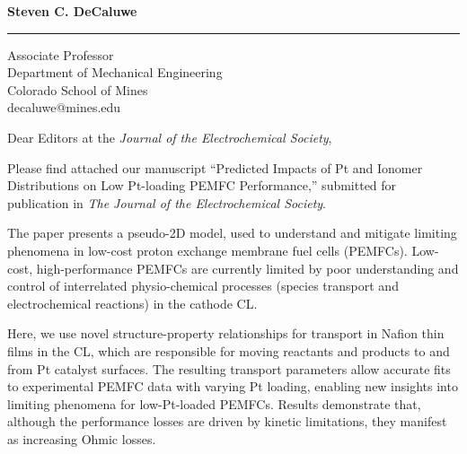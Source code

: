 \documentclass{letter} %
\begin{document}
\longindentation=0pt                       %
\let\raggedleft\raggedright                %
 
 
\begin{letter}{ }

\vspace{-20mm}
\begin{flushleft}
{\large\bf Steven C. DeCaluwe}
\end{flushleft}
\medskip\hrule height 1pt
\begin{flushright}
\hfill Associate Professor\\
\hfill Department of Mechanical Engineering \\
\hfill Colorado School of Mines \\
\hfill decaluwe@mines.edu\\
\end{flushright} 

\opening{Dear Editors at the {\it Journal of the Electrochemical Society},} 

\noindent Please find attached our manuscript ``Predicted Impacts of Pt and Ionomer Distributions on Low Pt-loading PEMFC Performance,'' submitted for publication in \emph{The Journal of the Electrochemical Society}. 

The paper presents a pseudo-2D model, used to understand and mitigate limiting phenomena in low-cost proton exchange membrane fuel cells (PEMFCs). Low-cost, high-performance PEMFCs are currently limited by poor understanding and control of interrelated physio-chemical processes (species transport and electrochemical reactions) in the cathode CL.  

Here, we use novel structure-property relationships for transport in Nafion thin films in the CL, which are responsible for moving reactants and products to and from Pt catalyst surfaces. The resulting transport parameters allow accurate fits to experimental PEMFC data with varying Pt loading, enabling new insights into limiting phenomena for low-Pt-loaded PEMFCs. Results demonstrate that, although the performance losses are driven by kinetic limitations, they manifest as increasing Ohmic losses. %


\end{letter}
\end{document}
